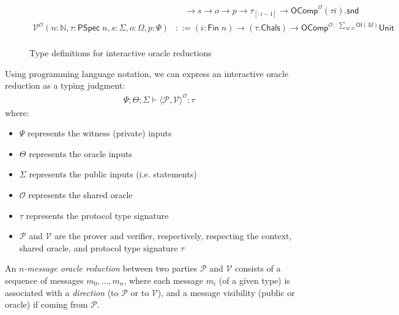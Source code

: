 \begin{figure}[t]
\begin{align}
        & \quad \to s \to o \to p \to \tau_{[:i - 1]} \to \mathsf{OComp}^{\mathcal{O}} (\tau i).\mathsf{snd} \\
        \mathcal{V}^{\mathcal{O}} (n : \mathbb{N}, \tau : \mathsf{PSpec}\; n, s : \varSigma, o : \Omega, p : \Psi) &::= (i : \mathsf{Fin}\; n) \to (\tau.\mathsf{Chals}) \to \mathsf{OComp}^{\mathcal{O} :: \sum_{M : \Omega} \mathsf{OI}(M)} \mathsf{Unit} \\
    \end{align}
    \caption{Type definitions for interactive oracle reductions}
    \label{fig:type-defs}
    \end{figure}

Using programming language notation, we can express an interactive oracle reduction as a typing judgment:
\begin{align}
    \Psi; \Theta; \varSigma \vdash \langle\mathcal{P}, \mathcal{V}\rangle^{\mathcal{O}} : \tau
\end{align}
where:
\begin{itemize}
    \item $\Psi$ represents the witness (private) inputs
    \item $\Theta$ represents the oracle inputs
    \item $\varSigma$ represents the public inputs (i.e. statements)
    \item $\mathcal{O}$ represents the shared oracle
    \item $\tau$ represents the protocol type signature
    \item $\mathcal{P}$ and $\mathcal{V}$ are the prover and verifier, respectively, respecting the context, shared oracle, and protocol type signature $\tau$
\end{itemize}

\begin{definition}
    \label{def:oracle_reduction_type_signature}
    An \emph{$n$-message oracle reduction} between two parties $\mathcal{P}$ and $\mathcal{V}$
    consists of a sequence of messages $m_0, \dots, m_n$, where each message $m_i$ (of a given
    type) is associated with a \emph{direction} (to $\mathcal{P}$ or to $\mathcal{V}$), and a
    message visibility (public or oracle) if coming from $\mathcal{P}$.
    

\end{definition}

